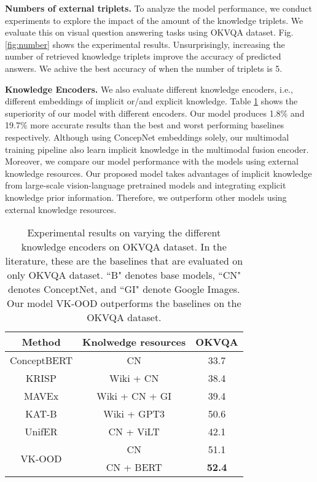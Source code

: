 \documentclass{article}
\begin{document}
\textbf{Numbers of external triplets.}  To analyze the model performance, we conduct experiments to explore the impact of the amount of the knowledge triplets. We evaluate this on visual question answering tasks using OKVQA dataset. Fig. \ref{fig:number} shows the experimental results. Unsurprisingly, increasing the number of retrieved knowledge triplets improve the accuracy of predicted answers. We achive the best accuracy of  when the number of triplets is 5.

\textbf{Knowledge Encoders.} We also evaluate different knowledge encoders, i.e., different embeddings of implicit or/and explicit knowledge. Table \ref{tab:ablation2} shows the superiority of our model with different encoders. Our model produces 1.8\% and 19.7\% more accurate results than the best and worst performing baselines respectively. Although using ConcepNet embeddings solely, our multimodal training pipeline also learn implicit knowledge in the multimodal fusion encoder. Moreover, we compare our model performance with the models using external knowledge resources. Our proposed model takes advantages of implicit knowledge from large-scale vision-language pretrained models and integrating explicit knowledge prior information. Therefore, we outperform other models using external knowledge resources.



\begin{table}[ht]
\caption{Experimental results on varying the different knowledge encoders on OKVQA dataset. In the literature, these are the baselines that are evaluated on only OKVQA dataset. ``B" denotes base models, ``CN" denotes ConceptNet, and ``GI" denote Google Images. Our model VK-OOD outperforms the baselines on the OKVQA dataset.} \label{tab:ablation2}
\begin{center}
\begin{tabular}{c|c|c}
\hline
\multicolumn{1}{c|}{Method} & \multicolumn{1}{c|}{Knolwedge resources}& \multicolumn{1}{c}{OKVQA} \\ \hline
ConceptBERT & CN & 33.7 \\
KRISP & Wiki + CN & 38.4 \\
MAVEx & Wiki + CN + GI & 39.4 \\
KAT-B & Wiki + GPT3 & 50.6\\
UnifER & CN + ViLT &42.1 \\ \hline
\multirow{2}{*}{VK-OOD} &   CN  &  51.1   \\ 
   &  CN + BERT  &  \textbf{52.4}  \\
\hline
\end{tabular}
\end{center}
\end{table}
\end{document}
